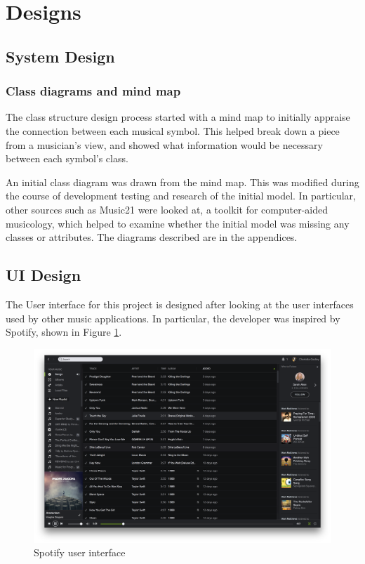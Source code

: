 \section{Designs}
\subsection{System Design}
\subsubsection{Class diagrams and mind map}
The class structure design process started with a mind map to initially appraise the connection between each musical symbol. This helped break down a piece from a musician's view, and showed what information would be necessary between each symbol's class.

An initial class diagram was drawn from the mind map. This was modified during the course of development testing and research of the initial model. In particular, other sources such as Music21 were looked at, a toolkit for computer-aided musicology\parencite{Music21}, which helped to examine whether the initial model was missing any classes or attributes. The diagrams described are in the appendices.
\subsection{UI Design}
The User interface for this project is designed after looking at the user interfaces used by other music applications. In particular, the developer was inspired by Spotify, shown in Figure \ref{fig:spotify}.

\begin{figure}[h]
    \centering
    \includegraphics[width=\textwidth]{screen.png}
    \caption{Spotify user interface}
    \label{fig:spotify}
\end{figure}
